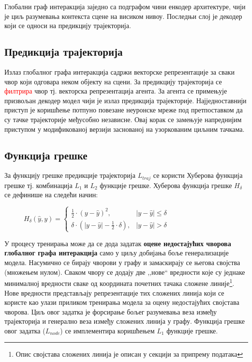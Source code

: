 \documentclass[11pt,oneside]{memoir}
\begin{document}
Глобални граф интеракција заједно са подграфом чини енкодер архитектуре,
чији је циљ разумевања контекста сцене на висиком нивоу. Последњи слој је декодер који се односи на предикцију трајекторија.

\subsection{Предикција трајекторија}

Излаз глобалног графа интеракција садржи векторске репрезентације за сваки чвор који одговара неком објекту на сцени.
За предикцију трајекторија се \textcolor{red}{филтрира} чвор тј. векторска репрезентација агента. За агента се примењује призвољан декодер модел
чији је излаз предикција трајекторије. Најједноставнији приступ је коришћење потпуно повезане неуронске мреже под претпоставком да су 
тачке трајекторије међусобно независне. Овај корак се замењује напреднијим приступом у модификованој верзији заснованој на узоркованим циљним тачкама.

\subsection{Функција грешке}

За функцију грешке предикције трајекторија $L_{traj}$ се користи Хуберова функција грешке тј. комбинација $L_1$ и $L_2$ функције грешке. Хуберова функција грешке $H_{\delta}$ се дефинише на следећи начин:

\begin{figure}[H]
  \centering
  $H_{\delta}(\hat{y}, y) = \begin{cases}
    \frac{1}{2}\cdot(y - \hat{y})^2, & |y - \hat{y}| \leq \delta \\
    \delta \cdot (|y - \hat{y}| - \frac{1}{2}\cdot \delta), & |y - \hat{y}| > \delta
  \end{cases}$
\end{figure}

У процесу тренирања може да се дода задатак \textbf{оцене недостајућих чворова глобалног графа интеракција} само у циљу
добијања боље генерализације модела. Насумично се бирају чворови у графу и замаскирају
се његова својства (множењем нулом).
Сваком чвору се додају две ,,нове`` вредности које су једнаке минималној вредности сваке од координата почетних
тачака сложене линије\footnote{Опис својстава сложених линија је описан у секцији за припрему података}. Нове вредности представљају репрезентације тих сложених линија који се користе као улази приликом тренирања модела за оцену недостајућих својстава чворова. Циљ овог задатка је форсирање бољег разумевања
веза између трајекторија и генерално веза између сложених линија у графу. Функција грешке овог задатка ($L_{node}$) се имплементира коришћењем $L_1$
функције грешке.
\end{document}
